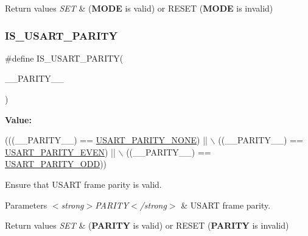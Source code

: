 \begin{DoxyRetVals}{Return values}
{\em S\+ET} & ({\bfseries M\+O\+DE} is valid) or R\+E\+S\+ET ({\bfseries M\+O\+DE} is invalid) \\
\hline
\end{DoxyRetVals}
\mbox{\label{group___u_s_a_r_t___private___macros_gadf7f983b8108bdd3fafb9e299d72a5cf}} 
\subsubsection{\texorpdfstring{I\+S\+\_\+\+U\+S\+A\+R\+T\+\_\+\+P\+A\+R\+I\+TY}{IS\_USART\_PARITY}}
{\footnotesize\ttfamily \#define I\+S\+\_\+\+U\+S\+A\+R\+T\+\_\+\+P\+A\+R\+I\+TY(\begin{DoxyParamCaption}\item[{}]{\+\_\+\+\_\+\+P\+A\+R\+I\+T\+Y\+\_\+\+\_\+ }\end{DoxyParamCaption})}

{\bfseries Value\+:}
\begin{DoxyCode}
(((\_\_PARITY\_\_) == \hyperlink{group___u_s_a_r_t___parity_ga85bfcbeb5ba1c34bbcda3f3e3b994846}{USART\_PARITY\_NONE}) || \(\backslash\)
                                     ((\_\_PARITY\_\_) == \hyperlink{group___u_s_a_r_t___parity_gae7630824c78a39366b7e5b4c55996200}{USART\_PARITY\_EVEN}) || \(\backslash\)
                                     ((\_\_PARITY\_\_) == \hyperlink{group___u_s_a_r_t___parity_ga184f3e22cb30ea94b797b02e94e774a1}{USART\_PARITY\_ODD}))
\end{DoxyCode}


Ensure that U\+S\+A\+RT frame parity is valid. 


\begin{DoxyParams}{Parameters}
{\em $<$strong$>$\+P\+A\+R\+I\+T\+Y$<$/strong$>$} & U\+S\+A\+RT frame parity. \\
\hline
\end{DoxyParams}

\begin{DoxyRetVals}{Return values}
{\em S\+ET} & ({\bfseries P\+A\+R\+I\+TY} is valid) or R\+E\+S\+ET ({\bfseries P\+A\+R\+I\+TY} is invalid) \\
\hline
\end{DoxyRetVals}
\mbox{\label{group___u_s_a_r_t___private___macros_ga6cd720e6cc78786d5117b6f01691685a}} 
